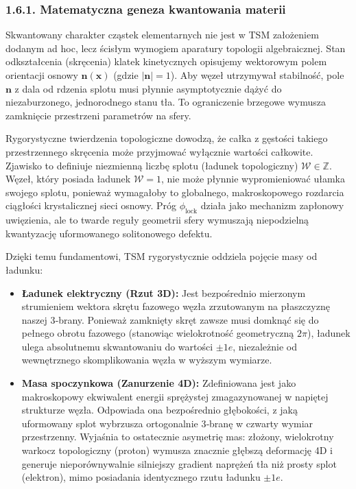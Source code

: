 \documentclass[
  letterpaper,
  DIV=11,
  numbers=noendperiod]{scrartcl}
\providecommand{\tightlist}{%
  \setlength{\itemsep}{0pt}\setlength{\parskip}{0pt}}
\numberwithin{equation}{subsection}
\begin{document}
\subsubsection{1.6.1. Matematyczna geneza kwantowania
materii}\label{matematyczna-geneza-kwantowania-materii}

Skwantowany charakter cząstek elementarnych nie jest w TSM założeniem
dodanym ad hoc, lecz ścisłym wymogiem aparatury topologii algebraicznej.
Stan odkształcenia (skręcenia) klatek kinetycznych opisujemy wektorowym
polem orientacji osnowy \(\mathbf{n}(\mathbf{x})\) (gdzie
\(|\mathbf{n}| = 1\)). Aby węzeł utrzymywał stabilność, pole
\(\mathbf{n}\) z dala od rdzenia splotu musi płynnie asymptotycznie
dążyć do niezaburzonego, jednorodnego stanu tła. To ograniczenie
brzegowe wymusza zamknięcie przestrzeni parametrów na sfery.

Rygorystyczne twierdzenia topologiczne dowodzą, że całka z gęstości
takiego przestrzennego skręcenia może przyjmować wyłącznie wartości
całkowite. Zjawisko to definiuje niezmienną liczbę splotu (ładunek
topologiczny) \(\mathcal{W} \in \mathbb{Z}\). Węzeł, który posiada
ładunek \(\mathcal{W} = 1\), nie może płynnie wypromieniować ułamka
swojego splotu, ponieważ wymagałoby to globalnego, makroskopowego
rozdarcia ciągłości krystalicznej sieci osnowy. Próg
\(\phi_{\text{lock}}\) działa jako mechanizm zapłonowy uwięzienia, ale
to twarde reguły geometrii sfery wymuszają niepodzielną kwantyzację
uformowanego solitonowego defektu.

Dzięki temu fundamentowi, TSM rygorystycznie oddziela pojęcie masy od
ładunku:

\begin{itemize}
\tightlist
\item
  \textbf{Ładunek elektryczny (Rzut 3D):} Jest bezpośrednio mierzonym
  strumieniem wektora skrętu fazowego węzła zrzutowanym na płaszczyznę
  naszej 3‑brany. Ponieważ zamknięty skręt zawsze musi domknąć się do
  pełnego obrotu fazowego (stanowiąc wielokrotność geometryczną
  \(2\pi\)), ładunek ulega absolutnemu skwantowaniu do wartości
  \(\pm 1e\), niezależnie od wewnętrznego skomplikowania węzła w wyższym
  wymiarze.
\item
  \textbf{Masa spoczynkowa (Zanurzenie 4D):} Zdefiniowana jest jako
  makroskopowy ekwiwalent energii sprężystej zmagazynowanej w napiętej
  strukturze węzła. Odpowiada ona bezpośrednio głębokości, z jaką
  uformowany splot wybrzusza ortogonalnie 3‑branę w czwarty wymiar
  przestrzenny. Wyjaśnia to ostatecznie asymetrię mas: złożony,
  wielokrotny warkocz topologiczny (proton) wymusza znacznie głębszą
  deformację 4D i generuje nieporównywalnie silniejszy gradient naprężeń
  tła niż prosty splot (elektron), mimo posiadania identycznego rzutu
  ładunku \(\pm 1e\).
\end{itemize}
\end{document}
